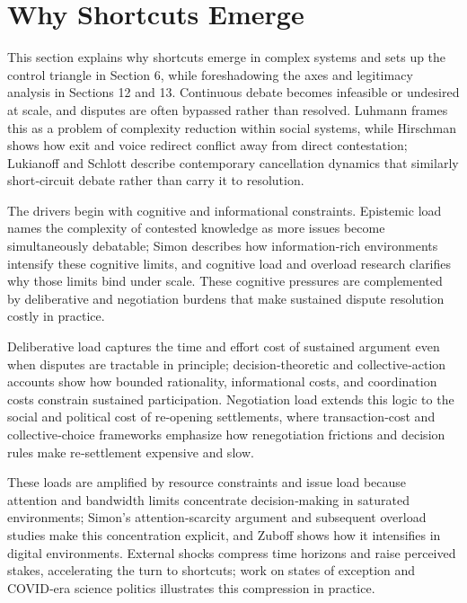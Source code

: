 \section{Why Shortcuts Emerge}
This section explains why shortcuts emerge in complex systems and sets up the control triangle in Section 6, while foreshadowing the axes and legitimacy analysis in Sections 12 and 13. Continuous debate becomes infeasible or undesired at scale, and disputes are often bypassed rather than resolved. Luhmann frames this as a problem of complexity reduction within social systems, while Hirschman shows how exit and voice redirect conflict away from direct contestation; Lukianoff and Schlott describe contemporary cancellation dynamics that similarly short‑circuit debate rather than carry it to resolution.\autocite{luhmann1995,hirschman1970,lukianoffschlott2023}

The drivers begin with cognitive and informational constraints. Epistemic load names the complexity of contested knowledge as more issues become simultaneously debatable; Simon describes how information‑rich environments intensify these cognitive limits, and cognitive load and overload research clarifies why those limits bind under scale.\autocite{simon1971,sweller1988,epplermengis2004} These cognitive pressures are complemented by deliberative and negotiation burdens that make sustained dispute resolution costly in practice.

Deliberative load captures the time and effort cost of sustained argument even when disputes are tractable in principle; decision‑theoretic and collective‑action accounts show how bounded rationality, informational costs, and coordination costs constrain sustained participation.\autocite{simon1947,downs1957,olson1965} Negotiation load extends this logic to the social and political cost of re‑opening settlements, where transaction‑cost and collective‑choice frameworks emphasize how renegotiation frictions and decision rules make re‑settlement expensive and slow.\autocite{coase1937,williamson1985,williamson2000,buchanantullock1962}

These loads are amplified by resource constraints and issue load because attention and bandwidth limits concentrate decision‑making in saturated environments; Simon’s attention‑scarcity argument and subsequent overload studies make this concentration explicit, and Zuboff shows how it intensifies in digital environments.\autocite{simon1971,epplermengis2004,zuboff2018} External shocks compress time horizons and raise perceived stakes, accelerating the turn to shortcuts; work on states of exception and COVID‑era science politics illustrates this compression in practice.\autocite{agamben2005,jasanoff2021}

